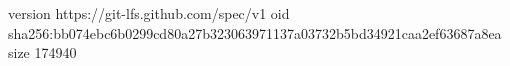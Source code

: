 version https://git-lfs.github.com/spec/v1
oid sha256:bb074ebc6b0299cd80a27b323063971137a03732b5bd34921caa2ef63687a8ea
size 174940
